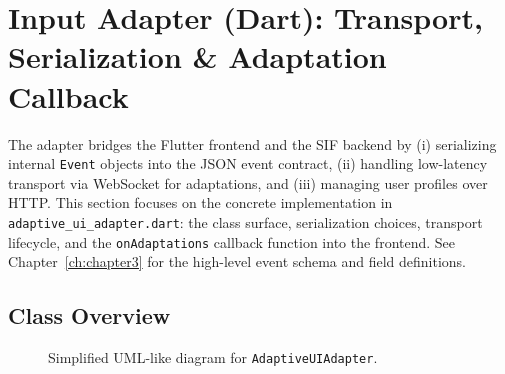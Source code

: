 \section{Input Adapter (Dart): Transport, Serialization \& Adaptation Callback}
The adapter bridges the Flutter frontend and the SIF backend by (i) serializing internal \texttt{Event} objects into the JSON event contract, (ii) handling low-latency transport via WebSocket for adaptations, and (iii) managing user profiles over HTTP. This section focuses on the concrete implementation in \texttt{adaptive\_ui\_adapter.dart}: the class surface, serialization choices, transport lifecycle, and the \texttt{onAdaptations} callback function into the frontend. See Chapter~\ref{ch:chapter3} for the high-level event schema and field definitions.

\subsection{Class Overview}
\begin{figure}[H]
\centering
{}
\caption{Simplified UML-like diagram for \texttt{AdaptiveUIAdapter}.}
\label{fig:adaptive-ui-adapter}
\end{figure}

